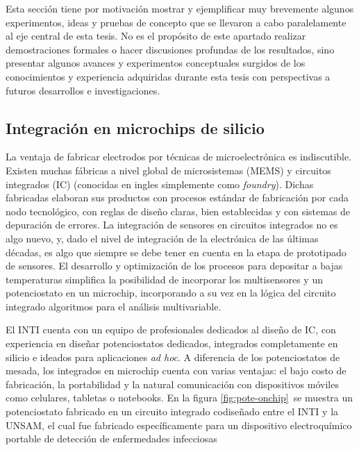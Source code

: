  		Esta sección tiene por motivación mostrar y ejemplificar muy brevemente algunos experimentos, ideas y pruebas de concepto que se llevaron a cabo paralelamente al eje central de esta tesis. No es el propósito de este apartado realizar demostraciones formales o hacer discusiones profundas de los resultados, sino presentar algunos avances y experimentos conceptuales surgidos de los conocimientos y experiencia adquiridas durante esta tesis con perspectivas a futuros desarrollos e investigaciones.

  
  \subsection{Integración en microchips de silicio}

	  La ventaja de fabricar electrodos por técnicas de microelectrónica es indiscutible. Existen muchas fábricas a nivel global de microsistemas (MEMS) y circuitos integrados (IC) (conocidas en ingles simplemente como \textit{foundry}). Dichas fabricadas elaboran sus productos con procesos estándar de fabricación por cada nodo tecnológico, con reglas de diseño claras, bien establecidas y con sistemas de depuración de errores. La integración de sensores en circuitos integrados no es algo nuevo, y, dado el nivel de integración de la electrónica de las últimas décadas, es algo que siempre se debe tener en cuenta en la etapa de prototipado de sensores.\cite{Wang2012,Liu1993,Novell2012,Yu2013,Sarkar2014} El desarrollo y optimización de los procesos para depositar \pdm\space a bajas temperaturas simplifica la posibilidad de incorporar los multisensores y un potenciostato en un microchip, incorporando a su vez en la lógica del circuito integrado algoritmos para el análisis multivariable.

	  El INTI cuenta con un equipo de profesionales dedicados al diseño de IC, con experiencia en diseñar potenciostatos dedicados, integrados completamente en silicio e ideados para aplicaciones \textit{ad hoc}\cite{}. A diferencia de los potenciostatos de mesada, los integrados en microchip cuenta con varias ventajas: el bajo costo de fabricación, la portabilidad y la natural comunicación con dispositivos móviles como celulares, tabletas o notebooks. En la figura \ref{fig:pote-onchip} se muestra un potenciostato fabricado en un circuito integrado codiseñado entre el INTI y la UNSAM, el cual fue fabricado específicamente para un dispositivo electroquímico portable de detección de enfermedades infecciosas \cite{}		 
 			
